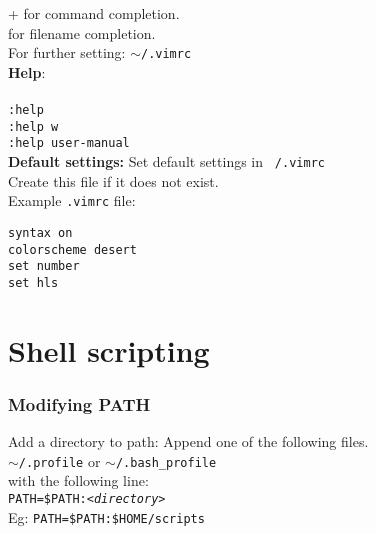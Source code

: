  +  for command completion.\\
 for filename completion.\\
For further setting: \texttt{$\sim$/.vimrc} \\
\textbf{Help}:\\
\\
\texttt{:help}\\
\texttt{:help w}\\
\texttt{:help user-manual}\\

\textbf{Default settings:}
Set default settings in \texttt{~/.vimrc} \\
Create this file if it does not exist. \\
Example \texttt{.vimrc} file:\\

\begin{mdframed}
\texttt{syntax on}\\
\texttt{colorscheme desert}\\
\texttt{set number}\\
\texttt{set hls}

\end{mdframed}

\vfill\null

\columnbreak

\section{Shell scripting}
\subsubsection{Modifying PATH}
Add a directory to path: Append one of the following files.\\
\texttt{$\sim$/.profile} or \texttt{$\sim$/.bash\_profile}\\
with the following line:\\
\texttt{PATH=\$PATH:\textit{<directory>}}\\
Eg: \texttt{PATH=\$PATH:\$HOME/scripts}\\



